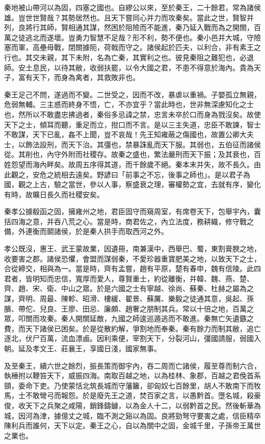 \begin{pinyinscope}
秦地被山帶河以為固，四塞之國也。自繆公以來，至於秦王，二十餘君，常為諸侯雄。豈世世賢哉？其勢居然也。且天下嘗同心并力而攻秦矣。當此之世，賢智并列，良將行其師，賢相通其謀，然困於阻險而不能進，秦乃延入戰而為之開關，百萬之徒逃北而遂壞。豈勇力智慧不足哉？形不利，勢不便也。秦小邑并大城，守險塞而軍，高壘毋戰，閉關據阨，荷戟而守之。諸侯起於匹夫，以利合，非有素王之行也。其交未親，其下未附，名為亡秦，其實利之也。彼見秦阻之難犯也，必退師。安土息民，以待其敝，收弱扶罷，以令大國之君，不患不得意於海內。貴為天子，富有天下，而身為禽者，其救敗非也。

秦王足己不問，遂過而不變。二世受之，因而不改，暴虐以重禍。子嬰孤立無親，危弱無輔。三主惑而終身不悟，亡，不亦宜乎？當此時也，世非無深慮知化之士也，然所以不敢盡忠拂過者，秦俗多忌諱之禁，忠言未卒於口而身為戮沒矣。故使天下之士，傾耳而聽，重足而立，拑口而不言。是以三主失道，忠臣不敢諫，智士不敢謀，天下已亂，姦不上聞，豈不哀哉！先王知雍蔽之傷國也，故置公卿大夫士，以飾法設刑，而天下治。其彊也，禁暴誅亂而天下服。其弱也，五伯征而諸侯從。其削也，內守外附而社稷存。故秦之盛也，繁法嚴刑而天下振；及其衰也，百姓怨望而海內畔矣。故周五序得其道，而千餘歲不絕。秦本末并失，故不長久。由此觀之，安危之統相去遠矣。野諺曰「前事之不忘，後事之師也」。是以君子為國，觀之上古，驗之當世，參以人事，察盛衰之理，審權勢之宜，去就有序，變化有時，故曠日長久而社稷安矣。

秦孝公據殽函之固，擁雍州之地，君臣固守而窺周室，有席卷天下，包舉宇內，囊括四海之意，并吞八荒之心。當是時，商君佐之，內立法度，務耕織，修守戰之備，外連衡而鬬諸侯，於是秦人拱手而取西河之外。

孝公既沒，惠王、武王蒙故業，因遺冊，南兼漢中，西舉巴、蜀，東割膏腴之地，收要害之郡。諸侯恐懼，會盟而謀弱秦，不愛珍器重寶肥美之地，以致天下之士，合從締交，相與為一。當是時，齊有孟嘗，趙有平原，楚有春申，魏有信陵。此四君者，皆明知而忠信，寬厚而愛人，尊賢重士，約從離衡，并韓、魏、燕、楚、齊、趙、宋、衛、中山之眾。於是六國之士有寧越、徐尚、蘇秦、杜赫之屬為之謀，齊明、周最、陳軫、昭滑、樓緩、翟景、蘇厲、樂毅之徒通其意，吳起、孫臏、帶佗、兒良、王廖、田忌、廉頗、趙奢之朋制其兵。常以十倍之地，百萬之眾，叩關而攻秦。秦人開關延敵，九國之師逡巡遁逃而不敢進。秦無亡矢遺鏃之費，而天下諸侯已困矣。於是從散約解，爭割地而奉秦。秦有餘力而制其敝，追亡逐北，伏尸百萬，流血漂鹵。因利乘便，宰割天下，分裂河山，彊國請服，弱國入朝。延及孝文王、莊襄王，享國日淺，國家無事。

及至秦王，續六世之餘烈，振長策而御宇內，吞二周而亡諸侯，履至尊而制六合，執棰拊以鞭笞天下，威振四海。南取百越之地，以為桂林、象郡，百越之君俛首系頸，委命下吏。乃使蒙恬北筑長城而守藩籬，卻匈奴七百餘里，胡人不敢南下而牧馬，士不敢彎弓而報怨。於是廢先王之道，焚百家之言，以愚黔首。墮名城，殺豪俊，收天下之兵聚之咸陽，銷鋒鑄鐻，以為金人十二，以弱黔首之民。然後斬華為城，因河為津，據億丈之城，臨不測之谿以為固。良將勁弩守要害之處，信臣精卒陳利兵而誰何，天下以定。秦王之心，自以為關中之固，金城千里，子孫帝王萬世之業也。


\end{pinyinscope}
